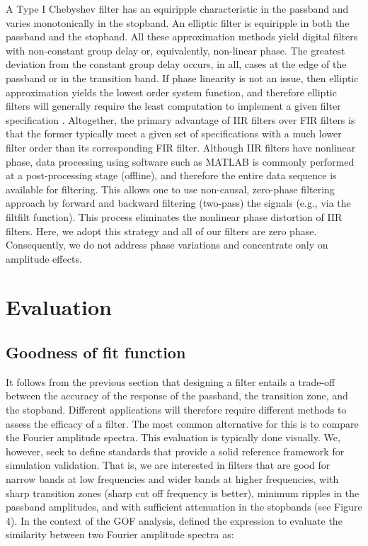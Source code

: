 \documentclass{article}
\begin{document}
A Type I Chebyshev filter has an equiripple characteristic in the passband and varies monotonically in the stopband. An elliptic filter is equiripple in both the passband and the stopband. All these approximation methods yield digital filters with non-constant group delay or, equivalently, non-linear phase. The greatest deviation from the constant group delay occurs, in all, cases at the edge of the passband or in the transition band. If phase linearity is not an issue, then elliptic approximation yields the lowest order system function, and therefore elliptic filters will generally require the least computation to implement a given filter specification \citep{Oppenheim_1989}. Altogether, the primary advantage of IIR filters over FIR filters is that the former typically meet a given set of specifications with a much lower filter order than its corresponding FIR filter. Although IIR filters have nonlinear phase, data processing using software such as MATLAB is commonly performed at a post-processing stage (offline), and therefore the entire data sequence is available for filtering. This allows one to use non-causal, zero-phase filtering approach by forward and backward filtering (two-pass) the signals (e.g., via the filtfilt function). This process eliminates the nonlinear phase distortion of IIR filters. Here, we adopt this strategy and all of our filters are zero phase. Consequently, we do not address phase variations and concentrate only on amplitude effects.



\section{Evaluation}
\subsection{Goodness of fit function}
It follows from the previous section that designing a filter entails a trade-off between the accuracy of the response of the passband, the transition zone, and the stopband. Different applications will therefore require different methods to assess the efficacy of a filter. The most common alternative for this is to compare the Fourier amplitude spectra. This  evaluation is typically done visually. We, however, seek to define standards that provide a solid reference framework for simulation validation. That is, we are interested in filters that are good for narrow bands at low frequencies and wider bands at higher frequencies, with sharp transition zones (sharp cut off frequency is better), minimum ripples in the passband amplitudes, and with sufficient attenuation in the stopbands (see Figure 4). In the context of the GOF analysis, \citet{Anderson_2004} defined the expression to evaluate the similarity between two Fourier amplitude spectra as:
\end{document}
